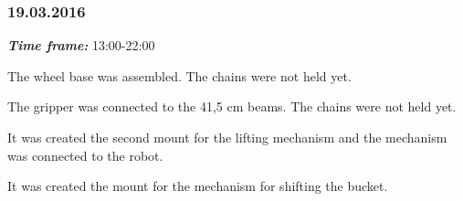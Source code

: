 \subsubsection{19.03.2016}
\textit{\textbf{Time frame:}} 13:00-22:00 

The wheel base was assembled. The chains were not held yet.

The gripper was connected to the 41,5 cm beams. The chains were not held yet.

It was created the second mount for the lifting mechanism and the mechanism was connected to the robot.

It was created the mount for the mechanism for shifting the bucket. 

\begin{figure}[H]
	\begin{minipage}[h]{0.47\linewidth}
		\caption{}
		\label{}
	\end{minipage}
	\hfill
	\begin{minipage}[h]{0.47\linewidth}

\end{minipage}
\end{figure}
